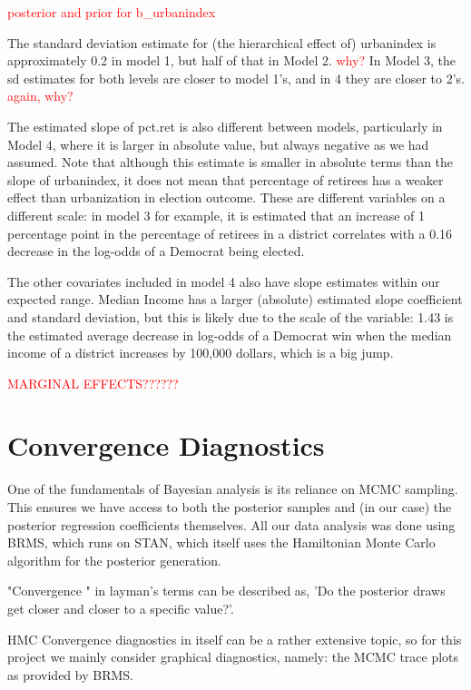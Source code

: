 \documentclass[12pt]{article}
\newcommand{\red}[1]{\textcolor{red}{#1}}
\begin{document}
\red{posterior and prior for b\_urbanindex}

The standard deviation estimate for (the hierarchical effect of) urbanindex is approximately 0.2 in model 1, but half of that in Model 2. \red{why?}  In Model 3, the sd estimates for both levels are closer to model 1's, and in 4 they are closer to 2's. \red{again, why?}


The estimated slope of pct.ret is also different between models, particularly in Model 4, where it is larger in absolute value, but always negative as we had assumed. Note that although this estimate is smaller in absolute terms than the slope of urbanindex, it does not mean that percentage of retirees has a weaker effect than urbanization in election outcome. These are different variables on a different scale: in model 3 for example, it is estimated that an increase of 1 percentage point in the percentage of retirees in a district correlates with a 0.16 decrease in the log-odds of a Democrat being elected.

The other covariates included in model 4 also have slope estimates within our expected range.
Median Income has a larger (absolute) estimated slope coefficient and standard deviation, but this is likely due to the scale of the variable: 1.43 is the estimated average decrease in log-odds of a Democrat win when the median income of a district increases by 100,000 dollars, which is a big jump.



\red{MARGINAL EFFECTS??????}


\section{Convergence Diagnostics}

One of the fundamentals of Bayesian analysis is its reliance on MCMC sampling. This ensures we have access to both the posterior samples and (in our case) the posterior regression coefficients themselves. All our data analysis was done using BRMS, which runs on STAN, which itself uses the Hamiltonian Monte Carlo algorithm for the posterior generation. 

"Convergence " in layman's terms can be described as, 'Do the posterior draws get closer and closer to a specific value?'.

HMC Convergence diagnostics in itself can be a rather extensive topic, so for this project we mainly consider graphical diagnostics, namely: the MCMC trace plots as provided by BRMS.
\end{document}
